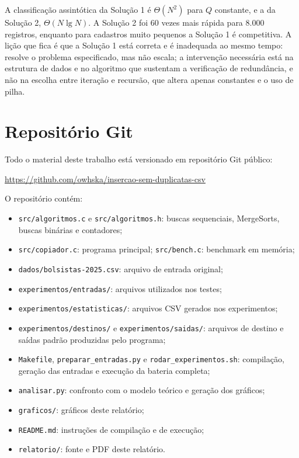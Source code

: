 \documentclass[11pt,a4paper]{article}
\newcommand{\repositorio}{https://github.com/owhska/insercao-sem-duplicatas-csv}
\begin{document}
A classificação assintótica da Solução 1 é $\Theta(N^2)$ para $Q$ constante, e a da Solução 2, $\Theta(N\lg N)$. A Solução 2 foi 60 vezes mais rápida para 8.000 registros, enquanto para cadastros muito pequenos a Solução 1 é competitiva. A lição que fica é que a Solução 1 está correta e é inadequada ao mesmo tempo: resolve o problema especificado, mas não escala; a intervenção necessária está na estrutura de dados e no algoritmo que sustentam a verificação de redundância, e não na escolha entre iteração e recursão, que altera apenas constantes e o uso de pilha.

\section{Repositório Git}

Todo o material deste trabalho está versionado em repositório Git público:

\begin{center}\ttfamily\url{\repositorio}\end{center}

O repositório contém:
\begin{itemize}[itemsep=1pt]
  \item \texttt{src/algoritmos.c} e \texttt{src/algoritmos.h}: buscas sequenciais, MergeSorts, buscas binárias e contadores;
  \item \texttt{src/copiador.c}: programa principal; \texttt{src/bench.c}: benchmark em memória;
  \item \texttt{dados/bolsistas-2025.csv}: arquivo de entrada original;
  \item \texttt{experimentos/entradas/}: arquivos utilizados nos testes;
  \item \texttt{experimentos/estatisticas/}: arquivos CSV gerados nos experimentos;
  \item \texttt{experimentos/destinos/} e \texttt{experimentos/saidas/}: arquivos de destino e saídas padrão produzidas pelo programa;
  \item \texttt{Makefile}, \texttt{preparar\_entradas.py} e \texttt{rodar\_experimentos.sh}: compilação, geração das entradas e execução da bateria completa;
  \item \texttt{analisar.py}: confronto com o modelo teórico e geração dos gráficos;
  \item \texttt{graficos/}: gráficos deste relatório;
  \item \texttt{README.md}: instruções de compilação e de execução;
  \item \texttt{relatorio/}: fonte e PDF deste relatório.
\end{itemize}
\end{document}
